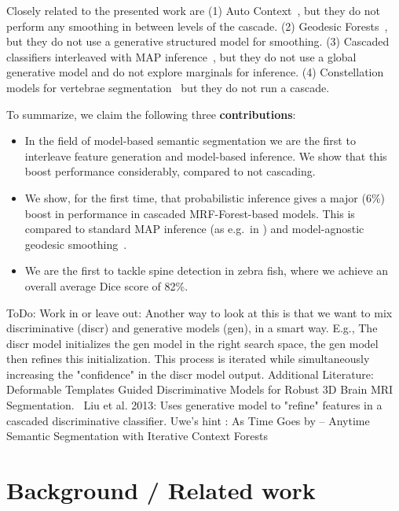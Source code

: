 \documentclass[10pt,twocolumn,letterpaper]{article}
\begin{document}
Closely related to the presented work are 
(1) Auto Context~\cite{AutoContext2008}, but they do not perform any smoothing in between levels of the cascade. 
(2) Geodesic Forests~\cite{GeoForests2013}, but they do not use a generative structured model for smoothing. 
(3) Cascaded classifiers interleaved with MAP inference~\cite{}, but they do not use a global generative model and do not explore marginals for inference. 
(4) Constellation models for vertebrae segmentation~\cite{Glocker2012,Glocker2013} but they do not run a cascade. 

To summarize, we claim the following three {\bf contributions}:
\begin{itemize}
\item In the field of model-based semantic segmentation we are the first to interleave feature generation and model-based inference. We show that this boost performance considerably, compared to not cascading. 
\item We show, for the first time, that probabilistic inference gives a major (6\%) boost in performance in cascaded MRF-Forest-based models. This is compared to standard MAP inference (as e.g.\ in \cite{Glocker2013,SeifertAnatomicalSPIE2009,TeethMICCAI2012}) and model-agnostic geodesic smoothing~\cite{GeoForests2013}. 
\item We are the first to tackle spine detection in zebra fish, where we achieve an overall average Dice score of 82\%.
\end{itemize}



ToDo: Work in or leave out:
%
Another way to look at this is that we want to mix discriminative (discr) and generative models (gen), in a smart way.  E.g., The discr model initializes the gen model in the right search space, the gen model then refines this initialization.  This process is iterated while simultaneously increasing the "confidence" in the discr model output. 
%
Additional Literature: 
%
Deformable Templates Guided Discriminative Models for Robust 3D Brain MRI Segmentation.~\cite{BrainSeg2013}  Liu et al.  2013: Uses generative model to "refine" features in a cascaded discriminative classifier.
%
Uwe's hint \cite{Denzler2012}: As Time Goes by -- Anytime Semantic Segmentation with Iterative Context Forests


\section{Background / Related work}
\end{document}
